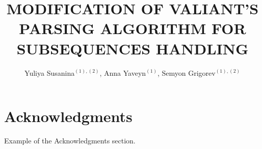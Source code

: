 \documentclass[12pt,a4paper]{cibb}
\title{\large $\ $\\ \bf  MODIFICATION OF VALIANT'S PARSING ALGORITHM FOR SUBSEQUENCES HANDLING}
\author{Yuliya Susanina$^{(1),(2)}$, Anna Yaveyn$^{(1)}$, Semyon Grigorev$^{(1),(2)}$}
\begin{document}
\thispagestyle{myheadings}
\pagestyle{myheadings}







\section*{\bf Acknowledgments}

Example of the Acknowledgments section.



%




\end{document}
